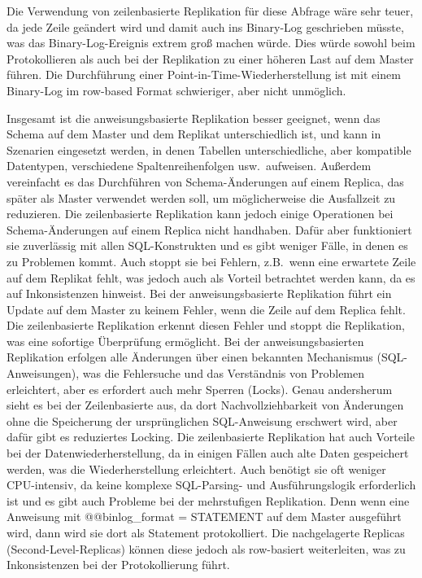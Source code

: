 Die Verwendung von zeilenbasierte Replikation für diese Abfrage wäre sehr teuer, da jede Zeile geändert wird und damit auch ins Binary-Log geschrieben müsste, was das Binary-Log-Ereignis extrem groß machen würde.
Dies würde sowohl beim Protokollieren als auch bei der Replikation zu einer höheren Last auf dem Master führen.
Die Durchführung einer Point-in-Time-Wiederherstellung ist mit einem Binary-Log im row-based Format schwieriger, aber nicht unmöglich.

Insgesamt ist die anweisungsbasierte Replikation besser geeignet, wenn das Schema auf dem Master und dem Replikat unterschiedlich ist, und kann in Szenarien eingesetzt werden, in denen Tabellen unterschiedliche, aber kompatible Datentypen, verschiedene Spaltenreihenfolgen usw.\ aufweisen.
Außerdem vereinfacht es das Durchführen von Schema-Änderungen auf einem Replica, das später als Master verwendet werden soll, um möglicherweise die Ausfallzeit zu reduzieren.
Die zeilenbasierte Replikation kann jedoch einige Operationen bei Schema-Änderungen auf einem Replica nicht handhaben.
Dafür aber funktioniert sie zuverlässig mit allen SQL-Konstrukten und es gibt weniger Fälle, in denen es zu Problemen kommt.
Auch stoppt sie bei Fehlern, z.B.\ wenn eine erwartete Zeile auf dem Replikat fehlt, was jedoch auch als Vorteil betrachtet werden kann, da es auf Inkonsistenzen hinweist.
Bei der anweisungsbasierte Replikation führt ein Update auf dem Master zu keinem Fehler, wenn die Zeile auf dem Replica fehlt.
Die zeilenbasierte Replikation erkennt diesen Fehler und stoppt die Replikation, was eine sofortige Überprüfung ermöglicht.
Bei der anweisungsbasierten Replikation erfolgen alle Änderungen über einen bekannten Mechanismus (SQL-Anweisungen), was die Fehlersuche und das Verständnis von Problemen erleichtert, aber es erfordert auch mehr Sperren (Locks).
Genau andersherum sieht es bei der Zeilenbasierte aus, da dort Nachvollziehbarkeit von Änderungen ohne die Speicherung der ursprünglichen SQL-Anweisung erschwert wird, aber dafür gibt es reduziertes Locking.
Die zeilenbasierte Replikation hat auch Vorteile bei der Datenwiederherstellung, da in einigen Fällen auch alte Daten gespeichert werden, was die Wiederherstellung erleichtert.
Auch benötigt sie oft weniger CPU-intensiv, da keine komplexe SQL-Parsing- und Ausführungslogik erforderlich ist und es gibt auch Probleme bei der mehrstufigen Replikation.
Denn wenn eine Anweisung mit @@binlog\_format = STATEMENT auf dem Master ausgeführt wird, dann wird sie dort als Statement protokolliert.
Die nachgelagerte Replicas (Second-Level-Replicas) können diese jedoch als row-basiert weiterleiten, was zu Inkonsistenzen bei der Protokollierung führt.

